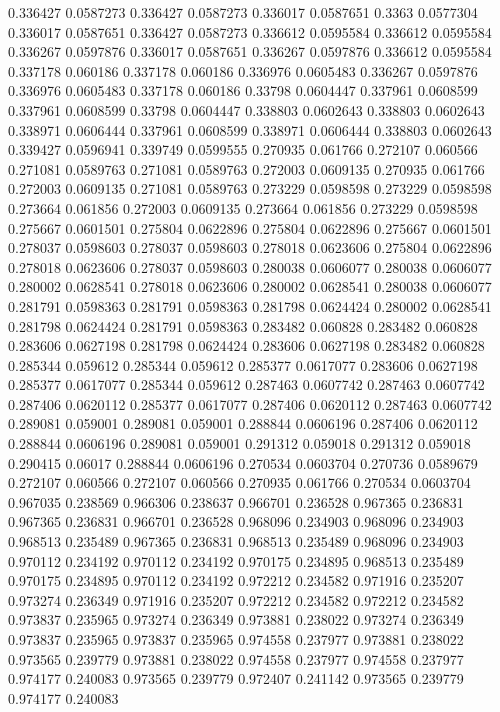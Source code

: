 0.336427 0.0587273
0.336427 0.0587273
0.336017 0.0587651
0.3363 0.0577304
0.336017 0.0587651
0.336427 0.0587273
0.336612 0.0595584
0.336612 0.0595584
0.336267 0.0597876
0.336017 0.0587651
0.336267 0.0597876
0.336612 0.0595584
0.337178 0.060186
0.337178 0.060186
0.336976 0.0605483
0.336267 0.0597876
0.336976 0.0605483
0.337178 0.060186
0.33798 0.0604447
0.337961 0.0608599
0.337961 0.0608599
0.33798 0.0604447
0.338803 0.0602643
0.338803 0.0602643
0.338971 0.0606444
0.337961 0.0608599
0.338971 0.0606444
0.338803 0.0602643
0.339427 0.0596941
0.339749 0.0599555
0.270935 0.061766
0.272107 0.060566
0.271081 0.0589763
0.271081 0.0589763
0.272003 0.0609135
0.270935 0.061766
0.272003 0.0609135
0.271081 0.0589763
0.273229 0.0598598
0.273229 0.0598598
0.273664 0.061856
0.272003 0.0609135
0.273664 0.061856
0.273229 0.0598598
0.275667 0.0601501
0.275804 0.0622896
0.275804 0.0622896
0.275667 0.0601501
0.278037 0.0598603
0.278037 0.0598603
0.278018 0.0623606
0.275804 0.0622896
0.278018 0.0623606
0.278037 0.0598603
0.280038 0.0606077
0.280038 0.0606077
0.280002 0.0628541
0.278018 0.0623606
0.280002 0.0628541
0.280038 0.0606077
0.281791 0.0598363
0.281791 0.0598363
0.281798 0.0624424
0.280002 0.0628541
0.281798 0.0624424
0.281791 0.0598363
0.283482 0.060828
0.283482 0.060828
0.283606 0.0627198
0.281798 0.0624424
0.283606 0.0627198
0.283482 0.060828
0.285344 0.059612
0.285344 0.059612
0.285377 0.0617077
0.283606 0.0627198
0.285377 0.0617077
0.285344 0.059612
0.287463 0.0607742
0.287463 0.0607742
0.287406 0.0620112
0.285377 0.0617077
0.287406 0.0620112
0.287463 0.0607742
0.289081 0.059001
0.289081 0.059001
0.288844 0.0606196
0.287406 0.0620112
0.288844 0.0606196
0.289081 0.059001
0.291312 0.059018
0.291312 0.059018
0.290415 0.06017
0.288844 0.0606196
0.270534 0.0603704
0.270736 0.0589679
0.272107 0.060566
0.272107 0.060566
0.270935 0.061766
0.270534 0.0603704
0.967035 0.238569
0.966306 0.238637
0.966701 0.236528
0.967365 0.236831
0.967365 0.236831
0.966701 0.236528
0.968096 0.234903
0.968096 0.234903
0.968513 0.235489
0.967365 0.236831
0.968513 0.235489
0.968096 0.234903
0.970112 0.234192
0.970112 0.234192
0.970175 0.234895
0.968513 0.235489
0.970175 0.234895
0.970112 0.234192
0.972212 0.234582
0.971916 0.235207
0.973274 0.236349
0.971916 0.235207
0.972212 0.234582
0.972212 0.234582
0.973837 0.235965
0.973274 0.236349
0.973881 0.238022
0.973274 0.236349
0.973837 0.235965
0.973837 0.235965
0.974558 0.237977
0.973881 0.238022
0.973565 0.239779
0.973881 0.238022
0.974558 0.237977
0.974558 0.237977
0.974177 0.240083
0.973565 0.239779
0.972407 0.241142
0.973565 0.239779
0.974177 0.240083
